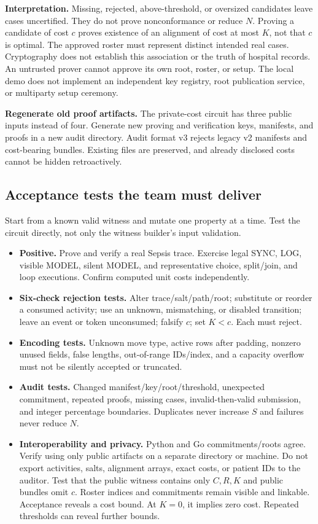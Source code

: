 \documentclass[10pt,a4paper]{article}
\newcommand{\must}[1]{\textbf{#1}}
\begin{document}
\must{Interpretation.} Missing, rejected, above-threshold, or oversized candidates leave cases uncertified. They do not prove nonconformance or reduce $N$. Proving a candidate of cost $c$ proves existence of an alignment of cost at most $K$, not that $c$ is optimal. The approved roster must represent distinct intended real cases. Cryptography does not establish this association or the truth of hospital records. An untrusted prover cannot approve its own root, roster, or setup. The local demo does not implement an independent key registry, root publication service, or multiparty setup ceremony.

\must{Regenerate old proof artifacts.} The private-cost circuit has three public inputs instead of four. Generate new proving and verification keys, manifests, and proofs in a new audit directory. Audit format v3 rejects legacy v2 manifests and cost-bearing bundles. Existing files are preserved, and already disclosed costs cannot be hidden retroactively.

\subsection*{Acceptance tests the team must deliver}
Start from a known valid witness and mutate one property at a time. Test the circuit directly, not only the witness builder's input validation.
\begin{itemize}
\item \must{Positive.} Prove and verify a real Sepsis trace. Exercise legal SYNC, LOG, visible MODEL, silent MODEL, and representative choice, split/join, and loop executions. Confirm computed unit costs independently.
\item \must{Six-check rejection tests.} Alter trace/salt/path/root; substitute or reorder a consumed activity; use an unknown, mismatching, or disabled transition; leave an event or token unconsumed; falsify $c$; set $K<c$. Each must reject.
\item \must{Encoding tests.} Unknown move type, active rows after padding, nonzero unused fields, false lengths, out-of-range IDs/index, and a capacity overflow must not be silently accepted or truncated.
\item \must{Audit tests.} Changed manifest/key/root/threshold, unexpected commitment, repeated proofs, missing cases, invalid-then-valid submission, and integer percentage boundaries. Duplicates never increase $S$ and failures never reduce $N$.
\item \must{Interoperability and privacy.} Python and Go commitments/roots agree. Verify using only public artifacts on a separate directory or machine. Do not export activities, salts, alignment arrays, exact costs, or patient IDs to the auditor. Test that the public witness contains only $C,R,K$ and public bundles omit $c$. Roster indices and commitments remain visible and linkable. Acceptance reveals a cost bound. At $K=0$, it implies zero cost. Repeated thresholds can reveal further bounds.
\end{itemize}
\end{document}
